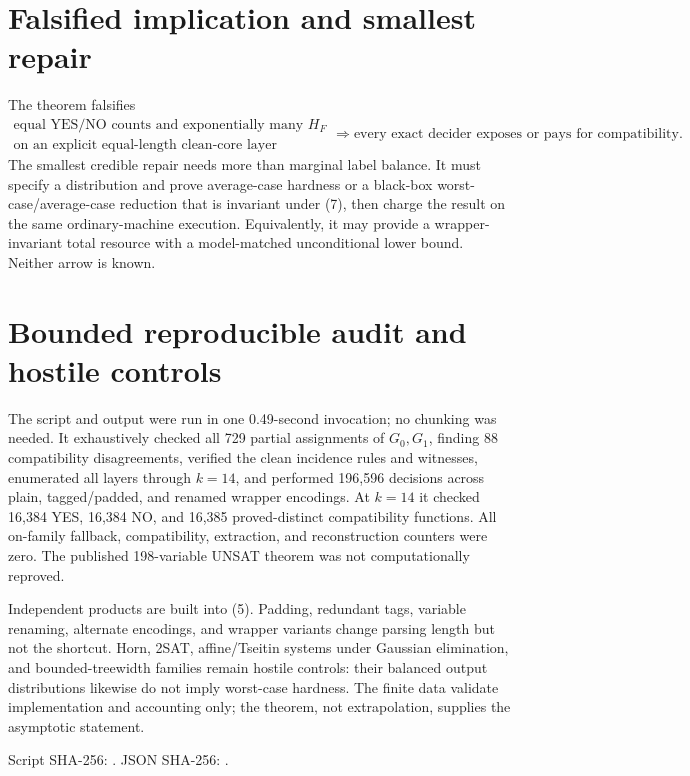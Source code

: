 \documentclass[11pt]{article}
\begin{document}
\section{Falsified implication and smallest repair}
The theorem falsifies
\[
 \substack{\text{equal YES/NO counts and exponentially many }H_F\\
            \text{on an explicit equal-length clean-core layer}}
 \Longrightarrow
 \text{every exact decider exposes or pays for compatibility}. \tag{10}
\]
The smallest credible repair needs more than marginal label balance.  It must
specify a distribution and prove average-case hardness or a black-box
worst-case/average-case reduction that is invariant under (7), then charge the
result on the same ordinary-machine execution.  Equivalently, it may provide
a wrapper-invariant total resource with a model-matched unconditional lower
bound.  Neither arrow is known.

\section{Bounded reproducible audit and hostile controls}
The script
 and output
were run in one 0.49-second invocation; no chunking was needed.  It exhaustively
checked all 729 partial assignments of \(G_0,G_1\), finding 88 compatibility
disagreements, verified the clean incidence rules and witnesses, enumerated
all layers through \(k=14\), and performed 196,596 decisions across plain,
tagged/padded, and renamed wrapper encodings.  At \(k=14\) it checked 16,384
YES, 16,384 NO, and 16,385 proved-distinct compatibility functions.  All
on-family fallback, compatibility, extraction, and reconstruction counters
were zero.  The published 198-variable UNSAT theorem was not computationally
reproved.

Independent products are built into (5).  Padding, redundant tags, variable
renaming, alternate encodings, and wrapper variants change parsing length but
not the shortcut.  Horn, 2SAT, affine/Tseitin systems under Gaussian
elimination, and bounded-treewidth families remain hostile controls: their
balanced output distributions likewise do not imply worst-case hardness.
The finite data validate implementation and accounting only; the theorem,
not extrapolation, supplies the asymptotic statement.

Script SHA-256:
.
JSON SHA-256:
.
\end{document}
